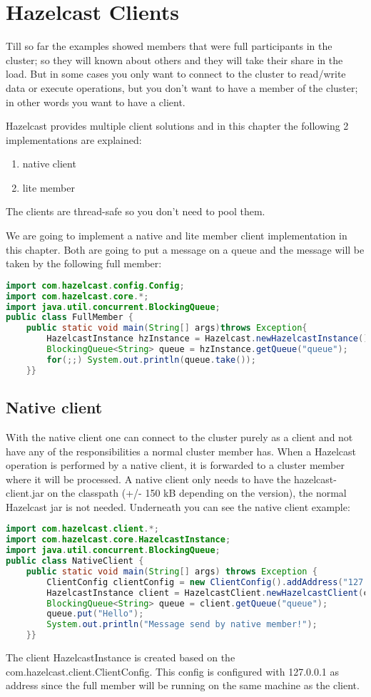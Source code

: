 \chapter{Hazelcast Clients}
Till so far the examples showed members that were full participants in the cluster; so they will known about others and they will take their share in the load. But in some cases you only want to connect to the cluster to read/write data or execute operations, but you don't want to have a member of the cluster; in other words you want to have a client.

Hazelcast provides multiple client solutions and in this chapter the following 2 implementations are explained:
\begin{enumerate}
\item native client
\item lite member
\end{enumerate}
The clients are thread-safe so you don't need to pool them.

We are going to implement a native and lite member client implementation in this chapter. Both are going to put a message on a queue and the message will be taken by the following full member:
\begin{lstlisting}[language=java]
import com.hazelcast.config.Config;
import com.hazelcast.core.*;
import java.util.concurrent.BlockingQueue;
public class FullMember {
    public static void main(String[] args)throws Exception{
        HazelcastInstance hzInstance = Hazelcast.newHazelcastInstance();
        BlockingQueue<String> queue = hzInstance.getQueue("queue");
        for(;;) System.out.println(queue.take());
    }}
\end{lstlisting}

\section{Native client}
With the native client one can connect to the cluster purely as a client and not have any of the responsibilities a normal cluster member has. When a Hazelcast operation is performed by a native client, it is forwarded to a cluster member where it will be processed. A native client only needs to have the hazelcast-client.jar on the classpath (+/- 150 kB depending on the version), the normal Hazelcast jar is not needed. Underneath you can see the native client example:
\begin{lstlisting}[language=java]
import com.hazelcast.client.*;
import com.hazelcast.core.HazelcastInstance;
import java.util.concurrent.BlockingQueue;
public class NativeClient {
    public static void main(String[] args) throws Exception {
        ClientConfig clientConfig = new ClientConfig().addAddress("127.0.0.1");
        HazelcastInstance client = HazelcastClient.newHazelcastClient(clientConfig);
        BlockingQueue<String> queue = client.getQueue("queue");
        queue.put("Hello");
        System.out.println("Message send by native member!");
    }}
\end{lstlisting}
The client HazelcastInstance is created based on the com.hazelcast.client.ClientConfig. This config is configured with 127.0.0.1 as address since the full member will be running on the same machine as the client.

